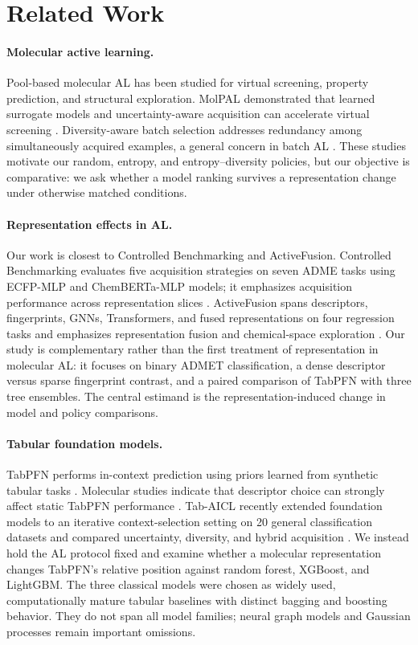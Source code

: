 \documentclass[twoside,11pt]{article}
\begin{document}
\section{Related Work}
\paragraph{Molecular active learning.}
Pool-based molecular AL has been studied for virtual screening, property prediction, and structural exploration. MolPAL demonstrated that learned surrogate models and uncertainty-aware acquisition can accelerate virtual screening \citep{graff2021molpal}. Diversity-aware batch selection addresses redundancy among simultaneously acquired examples, a general concern in batch AL \citep{sener2018coreset,biyik2019dpp}. These studies motivate our random, entropy, and entropy--diversity policies, but our objective is comparative: we ask whether a model ranking survives a representation change under otherwise matched conditions.

\paragraph{Representation effects in AL.}
Our work is closest to Controlled Benchmarking and ActiveFusion. Controlled Benchmarking evaluates five acquisition strategies on seven ADME tasks using ECFP-MLP and ChemBERTa-MLP models; it emphasizes acquisition performance across representation slices \citep{wu2026controlled}. ActiveFusion spans descriptors, fingerprints, GNNs, Transformers, and fused representations on four regression tasks and emphasizes representation fusion and chemical-space exploration \citep{evbarunegbe2026activefusion}. Our study is complementary rather than the first treatment of representation in molecular AL: it focuses on binary ADMET classification, a dense descriptor versus sparse fingerprint contrast, and a paired comparison of TabPFN with three tree ensembles. The central estimand is the representation-induced change in model and policy comparisons.

\paragraph{Tabular foundation models.}
TabPFN performs in-context prediction using priors learned from synthetic tabular tasks \citep{hollmann2025accurate}. Molecular studies indicate that descriptor choice can strongly affect static TabPFN performance \citep{chen2026tabpfn,benhicham2026molecular}. Tab-AICL recently extended foundation models to an iterative context-selection setting on 20 general classification datasets and compared uncertainty, diversity, and hybrid acquisition \citep{treerath2026active}. We instead hold the AL protocol fixed and examine whether a molecular representation changes TabPFN's relative position against random forest, XGBoost, and LightGBM. The three classical models were chosen as widely used, computationally mature tabular baselines with distinct bagging and boosting behavior. They do not span all model families; neural graph models and Gaussian processes remain important omissions.
\end{document}
